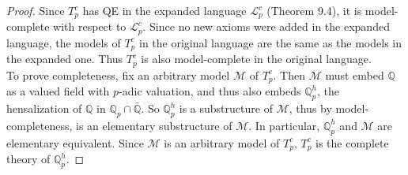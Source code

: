 \documentclass{article}
\begin{document}
  \begin{proof}
    Since $T_p^c$ has QE in the expanded language $\mathcal{L}_p^c$
    (Theorem 9.4), it is model-complete with respect to
    $\mathcal{L}_p^c$. Since no new axioms were added in the expanded
    language, the models of $T_p^c$ in the original language are the same
    as the models in the expanded one. Thus $T_p^c$ is also model-complete
    in the original language. \\

    To prove completeness, fix an arbitrary model $\mathcal{M}$ of $T_p^c$.
    Then $\mathcal{M}$ must embed $\mathbb{Q}$ as a valued field with
    $p$-adic valuation, and thus also embeds $\mathbb{Q}_p^h$, the
    hensalization of $\mathbb{Q}$ in $\mathbb{Q}_p\cap\bar{\mathbb{Q}}$. So
    $\mathbb{Q}_p^h$ is a substructure of $\mathcal{M}$, thus by
    model-completeness, is an elementary substructure of $\mathcal{M}$. In
    particular, $\mathbb{Q}_p^h$ and $\mathcal{M}$ are elementary
    equivalent. Since $\mathcal{M}$ is an arbitrary model of $T_p^c$,
    $T_p^c$ is the complete theory of $\mathbb{Q}_p^h$.
  \end{proof}
\end{document}
